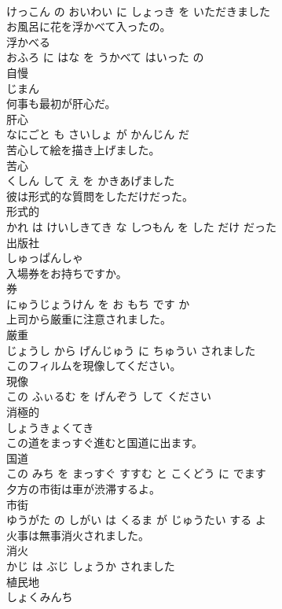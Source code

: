 \documentclass[8pt]{extreport}
\begin{document}
\begin{CJK}{UTF8}{min}
\\	けっこん の おいわい に しょっき を いただきました			
\\	お風呂に花を浮かべて入ったの。	
\\	浮かべる 
\\	おふろ に はな を うかべて はいった の			
\\	自慢	
\\	じまん		
\\	何事も最初が肝心だ。	
\\	肝心 
\\	なにごと も さいしょ が かんじん だ			
\\	苦心して絵を描き上げました。	
\\	苦心 
\\	くしん して え を かきあげました			
\\	彼は形式的な質問をしただけだった。	
\\	形式的 
\\	かれ は けいしきてき な しつもん を した だけ だった			
\\	出版社	
\\	しゅっぱんしゃ		
\\	入場券をお持ちですか。	
\\	券 
\\	にゅうじょうけん を お もち です か			
\\	上司から厳重に注意されました。	
\\	厳重 
\\	じょうし から げんじゅう に ちゅうい されました			
\\	このフィルムを現像してください。	
\\	現像 
\\	この ふぃるむ を げんぞう して ください			
\\	消極的	
\\	しょうきょくてき		
\\	この道をまっすぐ進むと国道に出ます。	
\\	国道 
\\	この みち を まっすぐ すすむ と こくどう に でます			
\\	夕方の市街は車が渋滞するよ。	
\\	市街 
\\	ゆうがた の しがい は くるま が じゅうたい する よ			
\\	火事は無事消火されました。	
\\	消火 
\\	かじ は ぶじ しょうか されました			
\\	植民地	
\\	しょくみんち		

\end{CJK}
\end{document}
